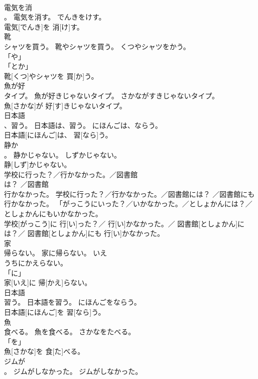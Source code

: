 \documentclass[8pt]{extreport}
\begin{document}
\begin{CJK}{UTF8}{min}
\\	電気を消
\\	。	電気を消す。	でんきをけす。	
\\	電気[でんき]を 消[け]す。		
\\	靴
\\	シャツを買う。	靴やシャツを買う。	くつやシャツをかう。	
\\	「や」 
\\	「とか」 
\\	靴[くつ]やシャツを 買[か]う。		
\\	魚が好
\\	タイプ。	魚が好きじゃないタイプ。	さかながすきじゃないタイプ。	
\\	魚[さかな]が 好[す]きじゃないタイプ。		
\\	日本語
\\	、習う。	日本語は、習う。	にほんごは、ならう。	
\\	日本語[にほんご]は、 習[なら]う。		
\\	静か
\\	。	静かじゃない。	しずかじゃない。	
\\	静[しず]かじゃない。		
\\	学校に行った？／行かなかった。／図書館
\\	は？ ／図書館
\\	行かなかった。	学校に行った？／行かなかった。／図書館には？ ／図書館にも行かなかった。	「がっこうにいった？／いかなかった。／としょかんには？／としょかんにもいかなかった。	
\\	学校[がっこう]に 行[い]った？／ 行[い]かなかった。／ 図書館[としょかん]には？／ 図書館[としょかん]にも 行[い]かなかった。		
\\	家
\\	帰らない。	家に帰らない。	{いえ
\\	うち}にかえらない。	
\\	「に」 
\\	家[いえ]に 帰[かえ]らない。		
\\	日本語
\\	習う。	日本語を習う。	にほんごをならう。	
\\	日本語[にほんご]を 習[なら]う。		
\\	魚
\\	食べる。	魚を食べる。	さかなをたべる。	
\\	「を」 
\\	魚[さかな]を 食[た]べる。		
\\	ジムが
\\	。	ジムがしなかった。	ジムがしなかった。	

\end{CJK}
\end{document}
